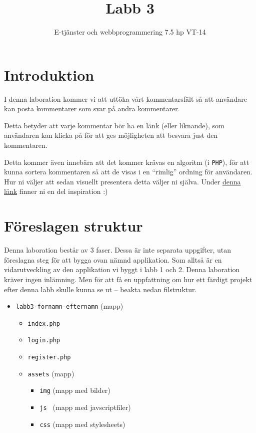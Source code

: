 \documentclass[12pt]{article}
\date{}
\title{ Labb 3 }
\author{ E-tjänster och webbprogrammering 7.5 hp VT-14 }
\begin{document}
\maketitle
\vspace{-2em}



\section{Introduktion}
I denna laboration kommer vi att uttöka vårt kommentarsfält så att användare kan posta kommentarer som svar på andra kommentarer.

Detta betyder att varje kommentar bör ha en länk (eller liknande), som användaren kan klicka på för att ges möjligheten att besvara just den kommentaren.

Detta kommer även innebära att det kommer krävas en algoritm (i \texttt{PHP}), för att kunna sortera kommentaren så att de visas i en ``rimlig'' ordning för användaren. Hur ni väljer att sedan visuellt presentera detta väljer ni själva. Under \href{http://designm.ag/designer-showcase/well-designed-threaded-comments-sections-in-webpages/}{denna länk} finner ni en del inspiration :)



\section{Föreslagen struktur}
Denna laboration består av 3 faser. Dessa är inte separata uppgifter, utan föreslagna steg för att bygga ovan nämnd applikation. Som alltså är en vidarutveckling av den applikation vi byggt i labb 1 och 2. Denna laboration kräver ingen inlämning. Men för att få en uppfattning om hur ett färdigt projekt efter denna labb skulle kunna se ut -- beakta nedan filstruktur.
\begin{itemize}
  \item \texttt{labb3-fornamn-efternamn} (mapp)
  \begin{itemize}
    \item \texttt{index.php}
    \item \texttt{login.php}
    \item \texttt{register.php}
    \item \texttt{assets} (mapp)
    \begin{itemize}
      \item \texttt{img} (mapp med bilder)
      \item \texttt{js } (mapp med javscriptfiler)
      \item \texttt{css} (mapp med stylesheets)
    \end{itemize}
  \end{itemize}
\end{itemize}
\end{document}
